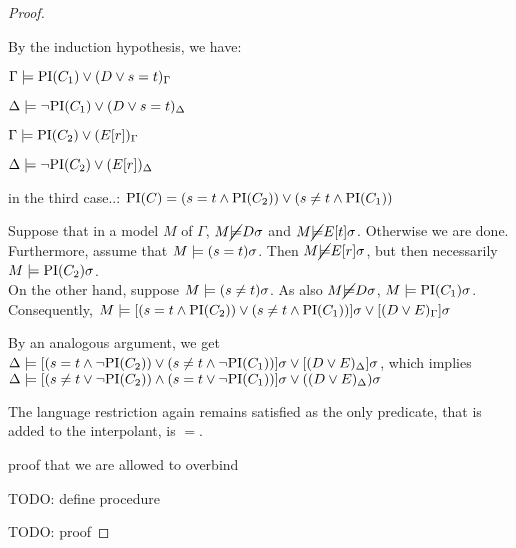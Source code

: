 \begin{proof}
\begin{itemize}
			\begin{prooftree}
			\end{prooftree}

			By the induction hypothesis, we have:

			$\Gamma \models \mathrm{PI}(C_1) \lor (D\lor s=t)_\Gamma$

			$\Delta \models \lnot \mathrm{PI}(C_1) \lor (D\lor s=t)_\Delta$

			$\Gamma \models \mathrm{PI}(C_2) \lor (E[r])_\Gamma$

			$\Delta \models \lnot \mathrm{PI}(C_2) \lor (E[r])_\Delta$

			in the third case..:
			$\mathrm{PI}(C) = (s=t \land \mathrm{PI}(C_2)) \lor (s\neq t \land \mathrm{PI}(C_1)) $
			
			Suppose that in a model $M$ of $\Gamma$, $M \cancel {\models} D\sigma$ and $M \cancel {\models} E[t]\sigma$. Otherwise we are done.
			Furthermore, assume that $M \models (s=t)\sigma$. Then $M \cancel {\models} E[r]\sigma$, but then necessarily $M \models \mathrm{PI}(C_2)\sigma$. \\
			On the other hand, suppose $M \models (s\neq t)\sigma$. As also $M \cancel {\models} D\sigma$, $M \models \mathrm{PI}(C_1)\sigma$.
			Consequently, $M \models [(s=t \land \mathrm{PI}(C_2)) \lor (s\neq t \land \mathrm{PI}(C_1))]\sigma \lor [(D \lor E)_\Gamma]\sigma$

			By an analogous argument, we get $\Delta \models [(s=t \land \lnot \mathrm{PI}(C_2)) \lor (s\neq t \land \lnot \mathrm{PI}(C_1))]\sigma \lor [(D \lor E)_\Delta]\sigma$,
			which implies
			$\Delta \models [( s\neq t \lor \lnot \mathrm{PI}(C_2)) \land (s = t \lor \lnot \mathrm{PI}(C_1))]\sigma \lor ((D \lor E)_\Delta)\sigma $


			The language restriction again remains satisfied as the only predicate, that is added to the interpolant, is $=$.
			\qedhere
	\end{itemize}

	proof that we are allowed to overbind

	TODO: define procedure

	TODO: proof

	\end{proof}


